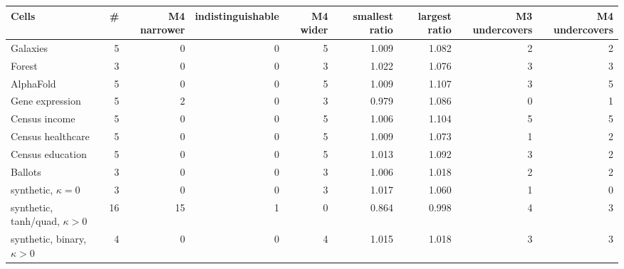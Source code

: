 \begin{tabular}{lrrrrrrrr}
\toprule
Cells & \# & M4 narrower & indistinguishable & M4 wider & smallest ratio & largest ratio & M3 undercovers & M4 undercovers \\
\midrule
Galaxies & 5 & 0 & 0 & 5 & 1.009 & 1.082 & 2 & 2 \\
Forest & 3 & 0 & 0 & 3 & 1.022 & 1.076 & 3 & 3 \\
AlphaFold & 5 & 0 & 0 & 5 & 1.009 & 1.107 & 3 & 5 \\
Gene expression & 5 & 2 & 0 & 3 & 0.979 & 1.086 & 0 & 1 \\
Census income & 5 & 0 & 0 & 5 & 1.006 & 1.104 & 5 & 5 \\
Census healthcare & 5 & 0 & 0 & 5 & 1.009 & 1.073 & 1 & 2 \\
Census education & 5 & 0 & 0 & 5 & 1.013 & 1.092 & 3 & 2 \\
Ballots & 3 & 0 & 0 & 3 & 1.006 & 1.018 & 2 & 2 \\
synthetic, $\kappa=0$ & 3 & 0 & 0 & 3 & 1.017 & 1.060 & 1 & 0 \\
synthetic, tanh/quad, $\kappa>0$ & 16 & 15 & 1 & 0 & 0.864 & 0.998 & 4 & 3 \\
synthetic, binary, $\kappa>0$ & 4 & 0 & 0 & 4 & 1.015 & 1.018 & 3 & 3 \\
\bottomrule
\end{tabular}
